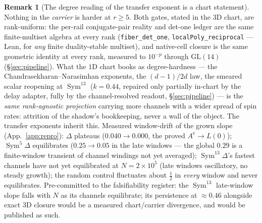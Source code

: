\documentclass[11pt]{article}
\theoremstyle{definition}
\newtheorem{remark}[theorem]{Remark}
\newcommand{\Sym}{\operatorname{Sym}}
\begin{document}
\begin{remark}[The degree reading of the transfer exponent is a chart statement]\label{rem:chartdegree}
Nothing in the \emph{carrier} is harder at $r\ge5$. Both gates, stated in the $3$D chart, are rank-uniform:
the per-rail conjugate-pair reality and det-one ledger are the same finite-multiset algebra at every rank
(\texttt{fiber\_det\_one}, \texttt{localPoly\_reciprocal} --- Lean, for \emph{any} finite duality-stable
multiset), and native-cell closure is the same geometric identity at every rank, measured to $10^{-p}$
through $\mathrm{GL}(14)$ (\S\ref{sec:pipeline}). What the $1$D chart books as degree-hardness --- the
Chandrasekharan--Narasimhan exponents, the $(d-1)/2d$ law, the smeared scalar reopening at $\Sym^{13}$
($k=0.44$, repaired only partially in-chart by the delay adapter, fully by the channel-resolved readout,
\S\ref{sec:pipeline}) --- is the \emph{same rank-agnostic projection} carrying more channels with a wider
spread of spin rates: attrition of the shadow's bookkeeping, never a wall of the object. The transfer
exponents inherit this. Measured window-drift of the grown slope (App.~\ref{app:repro}): $\Delta$ plateaus
($0.040\to0.000$, the proved $A^{\mathrm e}\to L(0)$); $\Sym^5\Delta$ equilibrates ($0.25\to0.05$ in the
late windows --- the global $0.29$ is a finite-window transient of channel windings not yet averaged);
$\Sym^{13}\Delta$'s fastest channels have not yet equilibrated at $N=2\times10^{5}$ (late windows
oscillatory, no steady growth); the random control fluctuates about $\tfrac12$ in \emph{every} window and
never equilibrates. Pre-committed to the falsifiability register: the $\Sym^{13}$ late-window slope falls
with $N$ as its channels equilibrate; its persistence at ${\approx}0.46$ alongside exact $3$D closure would
be a measured chart/carrier divergence, and would be published as such.
\end{remark}
\end{document}
